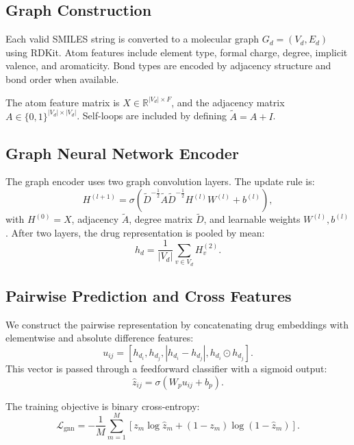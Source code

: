 \documentclass[conference]{IEEEtran}
\begin{document}
\subsection{Graph Construction}
Each valid SMILES string is converted to a molecular graph $G_d = (V_d, E_d)$ using RDKit. Atom features include element type, formal charge, degree, implicit valence, and aromaticity. Bond types are encoded by adjacency structure and bond order when available.

The atom feature matrix is $X\in\mathbb{R}^{|V_d|\times F}$, and the adjacency matrix $A\in\{0,1\}^{|V_d|\times|V_d|}$. Self-loops are included by defining $\tilde{A} = A + I$.

\subsection{Graph Neural Network Encoder}
The graph encoder uses two graph convolution layers. The update rule is:
\begin{equation}
    H^{(l+1)} = \sigma\left(\tilde{D}^{-\frac{1}{2}} \tilde{A} \tilde{D}^{-\frac{1}{2}} H^{(l)} W^{(l)} + b^{(l)}\right),
\end{equation}
with $H^{(0)} = X$, adjacency $\tilde{A}$, degree matrix $\tilde{D}$, and learnable weights $W^{(l)}, b^{(l)}$. After two layers, the drug representation is pooled by mean:
\begin{equation}
    h_d = \frac{1}{|V_d|} \sum_{v \in V_d} H_v^{(2)}.
\end{equation}

\subsection{Pairwise Prediction and Cross Features}
We construct the pairwise representation by concatenating drug embeddings with elementwise and absolute difference features:
\begin{equation}
    u_{ij} = [h_{d_i}, h_{d_j}, |h_{d_i} - h_{d_j}|, h_{d_i} \odot h_{d_j}].
\end{equation}
This vector is passed through a feedforward classifier with a sigmoid output:
\begin{equation}
    \hat{z}_{ij} = \sigma(W_p u_{ij} + b_p).
\end{equation}

The training objective is binary cross-entropy:
\begin{equation}
    \mathcal{L}_{\text{gnn}} = -\frac{1}{M} \sum_{m=1}^{M} \left[z_m \log \hat{z}_m + (1-z_m) \log(1-\hat{z}_m)\right].
\end{equation}
\end{document}
